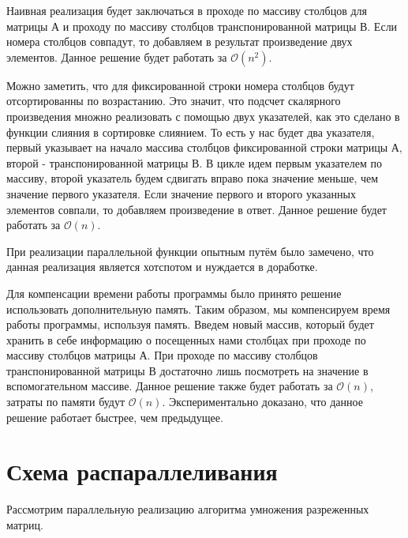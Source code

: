 \documentclass{report}
\begin{document}
Наивная реализация будет заключаться в проходе по массиву столбцов для матрицы А и проходу по массиву столбцов транспонированной матрицы В. Если номера столбцов совпадут, то добавляем в результат произведение двух элементов. Данное решение будет работать за $\mathcal{O}(n^2)$.

\par Можно заметить, что для фиксированной строки номера столбцов будут отсортированны по возрастанию. Это значит, что подсчет скалярного произведения множно реализовать с помощью двух указателей, как это сделано в функции слияния в сортировке слиянием.
То есть у нас будет два указателя, первый указывает на начало массива столбцов фиксированной строки матрицы А, второй - транспонированной матрицы В. В цикле идем первым указателем по массиву, второй указатель будем сдвигать вправо пока значение меньше, чем значение первого указателя. Если значение первого и второго указанных элементов совпали, то добавляем произведение в ответ. Данное решение будет работать за $\mathcal{O}(n)$.
\par При реализации параллельной функции опытным путём было замечено, что данная реализация является хотспотом и нуждается в доработке.
\par Для компенсации времени работы программы было принято решение использовать дополнительную память. Таким образом, мы компенсируем время работы программы, используя память. Введем новый массив, который будет хранить в себе информацию о посещенных нами столбцах при проходе по массиву столбцов матрицы А. При проходе по массиву столбцов транспонированной матрицы В достаточно лишь посмотреть на значение в вспомогательном массиве. Данное решение также будет работать за $\mathcal{O}(n)$, затраты по памяти будут $\mathcal{O}(n)$. Экспериментально доказано, что данное решение работает быстрее, чем предыдущее.

\newpage
\section*{Схема распараллеливания}
Рассмотрим параллельную реализацию алгоритма умножения разреженных матриц.
\end{document}
